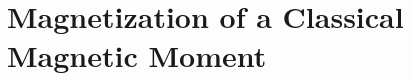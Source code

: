 \documentclass[\main/dresen_thesis.tex]{subfiles}
\begin{document}
\section{Magnetization of a Classical Magnetic Moment}\label{ch:appendix:calculations:magnetizationClassicalSpin}
\end{document}
